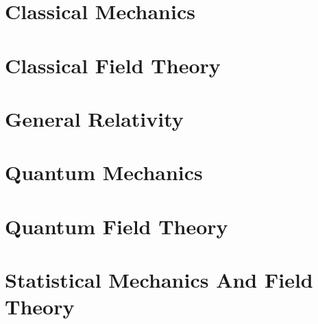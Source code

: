 \documentclass[cyan]{elegantnote}
\author{Yuyang Songsheng}
\begin{document}
\maketitle
\tableofcontents
\part{Classical Mechanics}

\part{Classical Field Theory}

\part{General Relativity}


\part{Quantum Mechanics}


\part{Quantum Field Theory}




\part{Statistical Mechanics And Field Theory}


\end{document}

